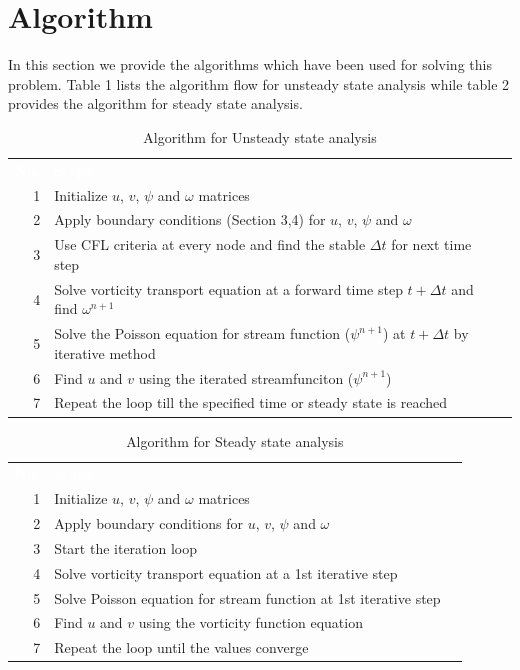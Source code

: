 \documentclass{article}
\newcommand{\head}[1]{%
   \textcolor{white}{\textbf{#1}}}
\begin{document}
\section{Algorithm}
In this section we provide the algorithms which have been used for solving this problem. Table 1 lists the algorithm flow for unsteady state analysis while table 2 provides the algorithm for steady state analysis.
\begin{table}[ht]
   \centering
   \sffamily
   \begin{tabular}{rlr}
     \rowcolor{black!75}
      \head{No.}& \head{Steps}  \\
     1 & Initialize $u$, $v$, $\psi$ and $\omega$ matrices        \\
     2 & Apply boundary conditions (Section 3,4) for $u$, $v$, $\psi$ and $\omega$ \\
     3 & Use CFL criteria at every node and find the stable $\Delta t$ for next time step\\
     4 & Solve vorticity transport equation at a forward time step $t+\Delta t$ and find $\omega^{n+1}$ \\
     5 & Solve the Poisson equation for stream function ($\psi^{n+1}$) at  $t+\Delta t$ by iterative method  \\
     6 & Find $u$ and $v$ using the iterated streamfunciton ($\psi^{n+1}$)       \\
     7 & Repeat the loop till the specified time or steady state is reached   \\
  \end{tabular}
  \caption{Algorithm for Unsteady state analysis}
\end{table}

\begin{table}[ht]
   \centering
   \sffamily
   \begin{tabular}{rlr}
     \rowcolor{black!75}
      \head{No.}& \head{Steps}  \\
     1 & Initialize $u$, $v$, $\psi$ and $\omega$ matrices        \\
     2 & Apply boundary conditions for $u$, $v$, $\psi$ and $\omega$ \\
     3 & Start the iteration loop \\
     4 & Solve vorticity transport equation at a 1st iterative step \\
     5 & Solve Poisson equation for stream function at  1st iterative step  \\
     6 & Find $u$ and $v$ using the vorticity function equation      \\
     7 & Repeat the loop until the values converge     \\
  \end{tabular}
  \caption{Algorithm for Steady state analysis}
\end{table}
\end{document}
